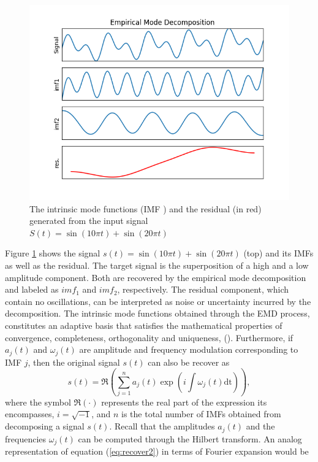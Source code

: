 \documentclass[../Main/thesis.tex]{subfiles}
\begin{document}
\begin{figure}[H] %
   \centering
   \includegraphics[width=5in]{../fig/imfEMD.png} 
   \caption{The intrinsic mode functions (IMF ) and the residual (in red) generated from the input signal $S(t) = \sin(10 \pi t) + \sin(20 \pi t) $}
   \label{fig:emd3}
\end{figure}
\justify
Figure \ref{fig:emd3} shows the signal  $s(t) = \sin(10 \pi t) + \sin(20 \pi t) $ (top) and its IMFs as well as the residual. The target signal is the superposition of a high and a low amplitude component. Both are recovered by the empirical mode decomposition and labeled as $imf_{1}$ and $imf_{2}$, respectively. The residual component, which contain no oscillations, can be interpreted as noise or uncertainty incurred by the decomposition. 
\justify
The intrinsic mode functions obtained through the EMD process, constitutes an adaptive basis that satisfies the mathematical properties of convergence, completeness, orthogonality and uniqueness, (\cite{huang98}). Furthermore, if $a_{j}(t)$ and $\omega_{j}(t)$ are amplitude and frequency modulation corresponding to IMF $j$, then the original signal $s(t)$ can also be recover as 
\begin{equation}\label{eq:recover2}
s(t) = \Re{\left( \sum_{j=1}^{n}a_{j}(t)\exp\left(i\int\omega_{j}(t)\mathrm{dt}\right)  \right)},
\end{equation} 
where the symbol $\Re(\cdot)$ represents the real part of the expression its encompasses, $i=\sqrt{-1}$, and $n$ is the total number of IMFs obtained from decomposing a signal $s(t)$. Recall that the amplitudes $a_{j}(t)$ and the frequencies $\omega_{j}(t)$ can be computed through the Hilbert transform. An analog representation of equation (\ref{eq:recover2}) in terms of Fourier expansion would be 
\end{document}
